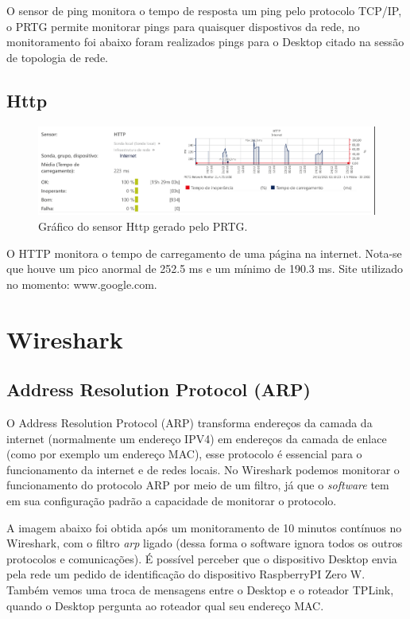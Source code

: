 \documentclass[12pt]{article}
\begin{document}
O sensor de ping monitora o tempo de resposta um ping pelo protocolo TCP/IP, o PRTG permite monitorar pings para quaisquer dispostivos da rede, no monitoramento foi abaixo foram realizados pings para o Desktop citado na sessão de topologia de rede.

\subsection{Http}

\begin{figure}[H]
    \includegraphics[width=\linewidth]{http.png}
    \caption{Gráfico do sensor Http gerado pelo PRTG.}
\end{figure}

O HTTP monitora o tempo de carregamento de uma página na internet. Nota-se que houve um pico anormal de 252.5 ms e um mínimo de 190.3 ms. Site utilizado no momento: www.google.com.

\section{Wireshark}

\subsection{Address Resolution Protocol (ARP)}

O Address Resolution Protocol (ARP) transforma endereços da camada da internet (normalmente um endereço IPV4) em endereços da camada de enlace (como por exemplo um endereço MAC), esse protocolo é essencial para o funcionamento da internet e de redes locais. No Wireshark podemos monitorar o funcionamento do protocolo ARP por meio de um filtro, já que o \emph{software} tem em sua configuração padrão a capacidade de monitorar o protocolo.

A imagem abaixo foi obtida após um monitoramento de 10 minutos contínuos no Wireshark, com o filtro \emph{arp} ligado (dessa forma o software ignora todos os outros protocolos e comunicações). É possível perceber que o dispositivo Desktop envia pela rede um pedido de identificação do dispositivo RaspberryPI Zero W. Também vemos uma troca de mensagens entre o Desktop e o roteador TPLink, quando o Desktop pergunta ao roteador qual seu endereço MAC.
\end{document}
